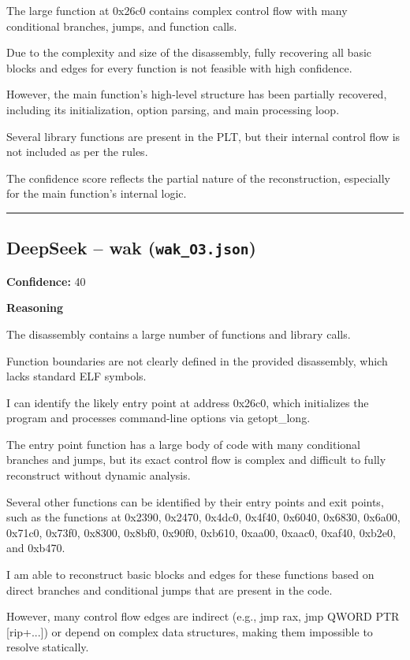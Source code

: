 The large function at 0x26c0 contains complex control flow with many conditional branches, jumps, and function calls.

Due to the complexity and size of the disassembly, fully recovering all basic blocks and edges for every function is not feasible with high confidence.

However, the main function's high-level structure has been partially recovered, including its initialization, option parsing, and main processing loop.

Several library functions are present in the PLT, but their internal control flow is not included as per the rules.

The confidence score reflects the partial nature of the reconstruction, especially for the main function's internal logic.

\bigskip
\hrule
\bigskip

\subsection{DeepSeek -- wak (\texttt{wak\_O3.json})}

\textbf{Confidence:} 40

\textbf{Reasoning}

The disassembly contains a large number of functions and library calls.

Function boundaries are not clearly defined in the provided disassembly, which lacks standard ELF symbols.

I can identify the likely entry point at address 0x26c0, which initializes the program and processes command-line options via getopt\_long.

The entry point function has a large body of code with many conditional branches and jumps, but its exact control flow is complex and difficult to fully reconstruct without dynamic analysis.

Several other functions can be identified by their entry points and exit points, such as the functions at 0x2390, 0x2470, 0x4dc0, 0x4f40, 0x6040, 0x6830, 0x6a00, 0x71c0, 0x73f0, 0x8300, 0x8bf0, 0x90f0, 0xb610, 0xaa00, 0xaac0, 0xaf40, 0xb2e0, and 0xb470.

I am able to reconstruct basic blocks and edges for these functions based on direct branches and conditional jumps that are present in the code.

However, many control flow edges are indirect (e.g., jmp rax, jmp QWORD PTR [rip+...]) or depend on complex data structures, making them impossible to resolve statically.

